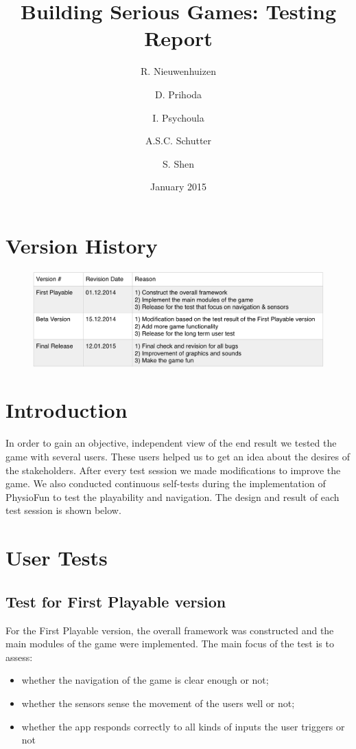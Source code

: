 \documentclass{article}
\title{Building Serious Games: Testing Report}
\author{
	R. Nieuwenhuizen \and
    D. Prihoda  \and
	I. Psychoula \and
	A.S.C. Schutter \and
	S. Shen
 }
\date{January 2015}
\begin{document}
\maketitle

\section{Version History}
\begin{figure}[H]
  \centering
  \includegraphics[width=0.85\linewidth]{VersionHistory.png}
\end{figure}

\section{Introduction}
In order to gain an objective, independent view of the end result we tested the game with several users. These users helped us to get an idea about the desires of the stakeholders. After every test session we made modifications to improve the game. We also conducted continuous self-tests during the implementation of PhysioFun to test the playability and navigation. The design and result of each test session is shown below.

\section{User Tests}
\subsection{Test for First Playable version}
For the First Playable version, the overall framework was constructed and the main modules of the game were implemented. The main focus of the test is to assess: 
\begin{itemize}
    \item{whether the navigation of the game is clear enough or not; }
    \item{whether the sensors sense the movement of the users well or not;}
    \item{whether the app responds correctly to all kinds of inputs the user triggers or not}
\end{itemize}
\end{document}

